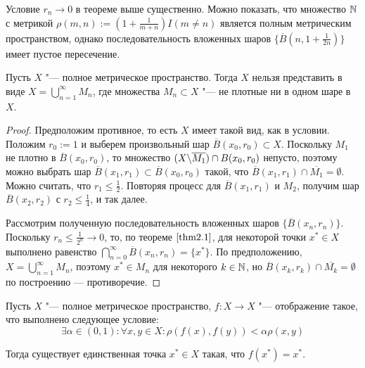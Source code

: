\begin{note}
    Условие $r_n \to 0$ в теореме выше существенно. Можно показать, что множество $\mathbb{N}$ с метрикой $\rho(m, n) := (1 + \frac 1{m + n})I(m \ne n)$ является полным метрическим пространством, однако последовательность вложенных шаров $\big\{\overline B(n, 1 + \frac 1{2n})\big\}$ имеет пустое пересечение.
\end{note}

\begin{theorem}[Бэра]\label{thm2.2}
    Пусть $X$ "--- полное метрическое пространство. Тогда $X$ нельзя представить в виде $X = \bigcup_{n = 1}^\infty M_n$, где множества $M_n \subset X$ "--- не плотные ни в одном шаре в $X$.
\end{theorem}

\begin{proof}
    Предположим противное, то есть $X$ имеет такой вид, как в условии. Положим $r_0 := 1$ и выберем произвольный шар $\overline B(x_0, r_0) \subset X$. Поскольку $M_1$ не плотно в $\overline B(x_0, r_0)$, то множество $(X \backslash \overline {M_1}) \cap B(x_0, r_0)$ непусто, поэтому можно выбрать шар $\overline{B}(x_1, r_1) \subset \overline{B}(x_0, r_0)$ такой, что $\overline{B}(x_1, r_1) \cap \overline {M_1} = \emptyset$. Можно считать, что $r_1 \le \frac 12$. Повторяя процесс для $\overline B(x_1, r_1)$ и $M_2$, получим шар $\overline B(x_2, r_2)$ с $r_2 \le \frac 14$, и так далее.

    Рассмотрим полученную последовательность вложенных шаров $\big\{\overline B(x_n, r_n)\big\}$. Поскольку $r_n \le \frac1{2^n} \to 0$, то, по теореме $\ref{thm2.1}$, для некоторой точки $x^* \in X$ выполнено равенство $\bigcap_{n = 0}^\infty \overline B(x_n, r_n) = \{x^*\}$. По предположению, $X = \bigcup_{n = 1}^\infty M_n$, поэтому $x^* \in M_n$ для некоторого $k \in \mathbb{N}$, но $\overline{B}(x_k, r_k) \cap \overline{M_k} = \emptyset$ по построению --- противоречие.
\end{proof}

\begin{theorem}\label{thm2.3}
    Пусть $X$ "--- полное метрическое пространство, $f : X \to X$ "--- отображение такое, что выполнено следующее условие:
    \[\exists \alpha \in (0, 1): \forall x, y \in X: \rho(f(x), f(y)) < \alpha \rho(x, y)\]

    Тогда существует единственная точка $x^* \in X$ такая, что $f(x^*) = x^*$.
\end{theorem}

